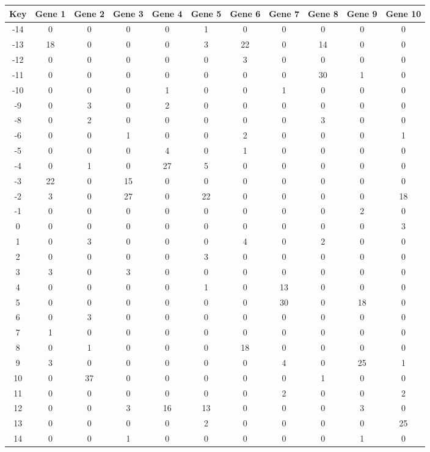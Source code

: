 \begin{tabular}{|c|c|c|c|c|c|c|c|c|c|c|}
\hline
Key & Gene 1 & Gene 2 & Gene 3 & Gene 4 & Gene 5 & Gene 6 & Gene 7 & Gene 8 & Gene 9 & Gene 10 \\
\hline
-14 & 0 & 0 & 0 & 0 & 1 & 0 & 0 & 0 & 0 & 0 \\
-13 & 18 & 0 & 0 & 0 & 3 & 22 & 0 & 14 & 0 & 0 \\
-12 & 0 & 0 & 0 & 0 & 0 & 3 & 0 & 0 & 0 & 0 \\
-11 & 0 & 0 & 0 & 0 & 0 & 0 & 0 & 30 & 1 & 0 \\
-10 & 0 & 0 & 0 & 1 & 0 & 0 & 1 & 0 & 0 & 0 \\
-9 & 0 & 3 & 0 & 2 & 0 & 0 & 0 & 0 & 0 & 0 \\
-8 & 0 & 2 & 0 & 0 & 0 & 0 & 0 & 3 & 0 & 0 \\
-6 & 0 & 0 & 1 & 0 & 0 & 2 & 0 & 0 & 0 & 1 \\
-5 & 0 & 0 & 0 & 4 & 0 & 1 & 0 & 0 & 0 & 0 \\
-4 & 0 & 1 & 0 & 27 & 5 & 0 & 0 & 0 & 0 & 0 \\
-3 & 22 & 0 & 15 & 0 & 0 & 0 & 0 & 0 & 0 & 0 \\
-2 & 3 & 0 & 27 & 0 & 22 & 0 & 0 & 0 & 0 & 18 \\
-1 & 0 & 0 & 0 & 0 & 0 & 0 & 0 & 0 & 2 & 0 \\
0 & 0 & 0 & 0 & 0 & 0 & 0 & 0 & 0 & 0 & 3 \\
1 & 0 & 3 & 0 & 0 & 0 & 4 & 0 & 2 & 0 & 0 \\
2 & 0 & 0 & 0 & 0 & 3 & 0 & 0 & 0 & 0 & 0 \\
3 & 3 & 0 & 3 & 0 & 0 & 0 & 0 & 0 & 0 & 0 \\
4 & 0 & 0 & 0 & 0 & 1 & 0 & 13 & 0 & 0 & 0 \\
5 & 0 & 0 & 0 & 0 & 0 & 0 & 30 & 0 & 18 & 0 \\
6 & 0 & 3 & 0 & 0 & 0 & 0 & 0 & 0 & 0 & 0 \\
7 & 1 & 0 & 0 & 0 & 0 & 0 & 0 & 0 & 0 & 0 \\
8 & 0 & 1 & 0 & 0 & 0 & 18 & 0 & 0 & 0 & 0 \\
9 & 3 & 0 & 0 & 0 & 0 & 0 & 4 & 0 & 25 & 1 \\
10 & 0 & 37 & 0 & 0 & 0 & 0 & 0 & 1 & 0 & 0 \\
11 & 0 & 0 & 0 & 0 & 0 & 0 & 2 & 0 & 0 & 2 \\
12 & 0 & 0 & 3 & 16 & 13 & 0 & 0 & 0 & 3 & 0 \\
13 & 0 & 0 & 0 & 0 & 2 & 0 & 0 & 0 & 0 & 25 \\
14 & 0 & 0 & 1 & 0 & 0 & 0 & 0 & 0 & 1 & 0 \\
\hline
\end{tabular}